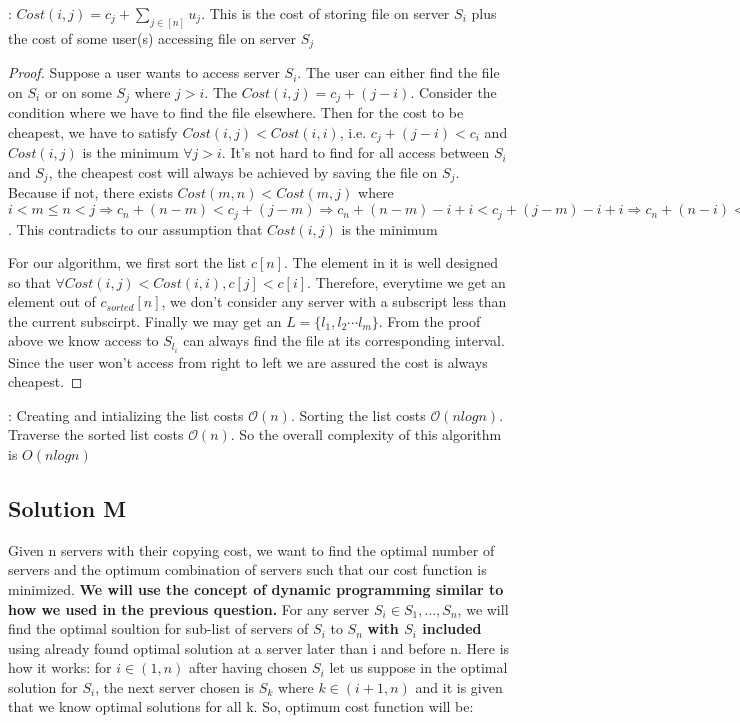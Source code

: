 \documentclass[11pt]{article}
\renewcommand{\O}{\mathcal{O}}
\begin{document}
: {\it $Cost(i, j) = c_j + \sum_{j \in [n]} u_j$}. This is the cost of storing file on server $S_i$ plus the cost of some user(s) accessing file on server $S_j$

\begin{proof}
  Suppose a user wants to access server $S_i$. The user can either find the file on $S_i$ or on some $S_j$ where $j > i$. The $Cost(i, j) = c_j + (j-i)$.
  Consider the condition where we have to find the file elsewhere. Then for the cost to be cheapest, we have to satisfy $Cost(i, j) < Cost(i, i)$, i.e. $c_j + (j-i) < c_i$ and $Cost(i, j)$ is the minimum $\forall j > i$. It's not hard to find for all access between $S_i$ and $S_j$, the cheapest cost will always be achieved by saving the file on $S_j$. Because if not, there exists $Cost(m, n) < Cost(m, j)$ where $i< m \leq n < j \Rightarrow c_n + (n-m) < c_j + (j-m) \Rightarrow c_n + (n-m) -i + i < c_j + (j-m) -i + i \Rightarrow c_n + (n-i) < c_j + (j-i) \Rightarrow Cost(i, n) < Cost(i, j)$. This contradicts to our assumption that $Cost(i, j)$ is the minimum

For our algorithm, we first sort the list $c[n]$. The element in it is well designed so that $\forall Cost(i, j) < Cost(i, i), c[j] < c[i]$. Therefore, everytime we get an element out of $c_{sorted}[n]$, we don't consider any server with a subscript less than the current subscirpt. Finally we may get an $L = \{l_1, l_2 \dotsb l_m\}$. From the proof above we know access to $S_{l_i}$ can always find the file at its corresponding interval. Since the user won't access from right to left we are assured the cost is always cheapest.
\end{proof}

: Creating and intializing the list costs $\O(n)$. Sorting the list costs $\O(nlogn)$. Traverse the sorted list costs $\O(n)$. So the overall complexity of this algorithm is $O(nlogn)$

\subsection{Solution M}
Given n servers with their copying cost, we want to find the optimal number of servers and the optimum combination of servers
such that our cost function is minimized. \newline
{\bf We will use the concept of dynamic programming similar to how we used in the previous question.} \newline
For any server $S_i \in S_1, \dots , S_n$, we will find the optimal soultion for sub-list of servers of $S_i$
to $S_n$ {\bf with $S_i$ included}  using already found optimal solution at a server later than i and before n. \newline
Here is how it works:  \newline
for $i \in (1,n)$ after having chosen $S_i$ let us suppose in the optimal solution for $S_i$, the next server chosen is $S_k$
where $k \in (i+1 , n)$ and it is given that we know optimal solutions for all k.  \newline
So, optimum cost function will be: \newline
\end{document}
